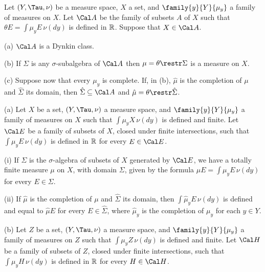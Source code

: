  Let $(Y,\Tau,\nu)$ be a measure space, $X$ a
set, and $\family{y}{Y}{\mu_y}$ a family of measures on $X$.
Let $\Cal A$ be the family of subsets $A$ of $X$ such that
$\theta E=\int\mu_yE\,\nu(dy)$ is defined in $\Bbb R$.   Suppose that
$X\in\Cal A$.

(a) $\Cal A$ is a Dynkin class.

(b) If $\Sigma$ is any $\sigma$-subalgebra of $\Cal A$ then
$\mu=\theta\restr\Sigma$ is a measure on $X$.

(c) Suppose now that every $\mu_y$ is complete.
If, in (b), $\hat\mu$ is the completion of $\mu$ and $\hat\Sigma$ its
domain, then $\hat\Sigma\subseteq\Cal A$ and
$\hat\mu=\theta\restr\hat\Sigma$.


 (a) Let $X$ be a set, $(Y,\Tau,\nu)$ a
measure space, and $\family{y}{Y}{\mu_y}$ a family of
measures on $X$ such that $\int\mu_yX\,\nu(dy)$ is defined and finite.
Let $\Cal E$ be
a family of subsets of $X$, closed under finite intersections, such that
$\int\mu_yE\,\nu(dy)$ is defined in $\Bbb R$ for every $E\in\Cal E$.

\quad(i) If $\Sigma$ is the $\sigma$-algebra of subsets of $X$ generated
by $\Cal E$, we have a totally finite measure $\mu$ on $X$, with domain
$\Sigma$, given by the
formula $\mu E=\int\mu_yE\,\nu(dy)$ for every $E\in\Sigma$.

\quad(ii) If $\hat\mu$ is the completion of $\mu$ and $\hat\Sigma$ its
domain, then $\int\hat\mu_yE\,\nu(dy)$ is defined and equal to
$\hat\mu E$ for every $E\in\hat\Sigma$,
where $\hat\mu_y$ is the completion of $\mu_y$ for each $y\in Y$.

(b) Let $Z$ be a set, $(Y,\Tau,\nu)$ a measure space, and
$\family{y}{Y}{\mu_y}$ a family of measures on $Z$ such that
$\int\mu_yZ\,\nu(dy)$ is defined and finite.   Let
$\Cal H$ be a family of subsets of $Z$,
closed under finite intersections, such that
$\int\mu_yH\,\nu(dy)$ is
defined in $\Bbb R$ for every $H\in\Cal H$.

